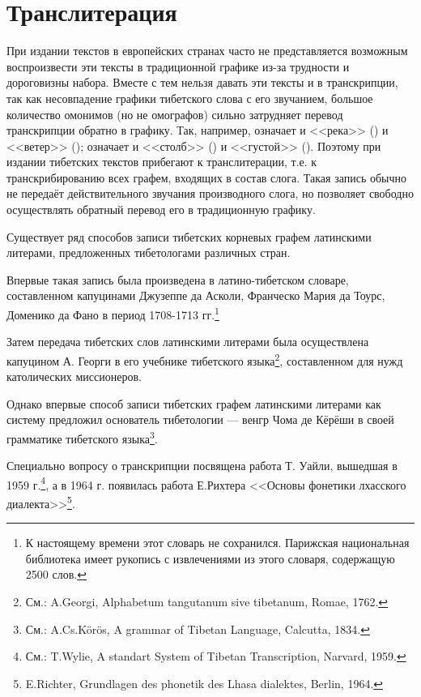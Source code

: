 \section{Транслитерация}

При издании текстов в европейских странах часто не представляется возможным воспроизвести эти тексты в традиционной графике из-за трудности и дороговизны набора. Вместе с тем нельзя давать эти тексты и в транскрипции, так как несовпадение графики тибетского слова с его звучанием, большое количество омонимов (но не омографов) сильно затрудняет перевод транскрипции обратно в графику. Так, например,  означает и <<река>> () и <<ветер>> ();  означает и <<столб>> () и <<густой>> (). Поэтому при издании тибетских текстов прибегают к транслитерации, т.е. к транскрибированию всех графем, входящих в состав слога. Такая запись обычно не передаёт действительного звучания производного слога, но позволяет свободно осуществлять обратный перевод его в традиционную графику.

Существует ряд способов записи тибетских корневых графем латинскими литерами, предложенных тибетологами различных стран.

Впервые такая запись была произведена в латино-тибетском словаре, составленном капуцинами Джузеппе да Асколи, Франческо Мария да Тоурс, Доменико да Фано в период 1708-1713 гг.\footnote[12]{К настоящему времени этот словарь не сохранился. Парижская национальная библиотека имеет рукопись с извлечениями из этого словаря, содержащую 2500 слов.}

Затем передача тибетских слов латинскими литерами была осуществлена капуцином А. Георги в его учебнике тибетского языка\footnote[13]{См.: A.Georgi, Alphabetum tangutanum sive tibetanum, Romae, 1762.}, составленном для нужд католических миссионеров.

Однако впервые способ записи тибетских графем латинскими литерами как систему предложил основатель тибетологии --- венгр Чома де Кёрёши в своей грамматике тибетского языка\footnote[14]{См.: A.Cs.Körös, A grammar of Tibetan Language, Calcutta, 1834.}.

Специально вопросу о транскрипции посвящена работа Т. Уайли, вышедшая в 1959 г.\footnote[15]{См.: T.Wylie, A standart System of Tibetan Transcription, Narvard, 1959.}, а в 1964 г. появилась работа Е.Рихтера <<Основы фонетики лхасского диалекта>>\footnote[16]{E.Richter, Grundlagen des phonetik des Lhasa dialektes, Berlin, 1964.}.


